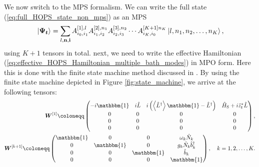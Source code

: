 We now switch to the MPS formalism. We can write the full state (\ref{eq:full_HOPS_state_non_mps}) as an MPS
\begin{equation*}
    \ket*{\vb*{\Psi_t}} = \sum_{l,\vb{n},\vb{i}} A_{i_0, i_1}^{[1], l} A_{i_1, i_2}^{[2], n_1} A_{i_2, i_3}^{[3], n_2} \cdots A_{i_K, i_0}^{[K+1] n_K} \ket*{l, n_1, n_2, \dots, n_{K}},
\end{equation*}
using $K+1$ tensors in total. next, we need to write the effective Hamiltonian (\ref{eq:effective_HOPS_Hamiltonian_multiple_bath_modes})
in MPO form. Here this is done with the finite state machine method discussed in \cite{Motruk:2016}. By using the finite state machine depicted
in Figure \ref{fig:state_machine}, we arrive at the following tensors:
\begin{equation}
    \label{eq:HOMPS_MPO}
    \begin{aligned}
        \vb*{W}^{[1]} \coloneqq
        \begin{pmatrix}
            -i\mathbbm{1} & i\hat{L} & i\left(\left\langle \hat{L}^\dagger\right\rangle \mathbbm{1} - \hat{L}^\dagger\right) & \hat{H}_\text{S} + i\tilde{z}_t^*\hat{L} \\
            0            & 0        & 0                                                                                    & 0                                        \\
            0            & 0        & 0                                                                                    & 0                                        \\
            0            & 0        & 0                                                                                    & 0                                        \\
        \end{pmatrix},\\
        \vb*{W}^{[k+1]} \coloneqq
        \begin{pmatrix}
            \mathbbm{1} & 0          & 0          & \omega_k\hat{N}_k                \\
            0          & \mathbbm{1} & 0          & g_k \hat{N}_k  \hat{b}_k^\dagger \\
            0          & 0          & \mathbbm{1} & \hat{b}_k                        \\
            0          & 0          & 0          & \mathbbm{1}                       \\
        \end{pmatrix}, \quad k = 1, 2, \dots, K.
    \end{aligned}
\end{equation}
